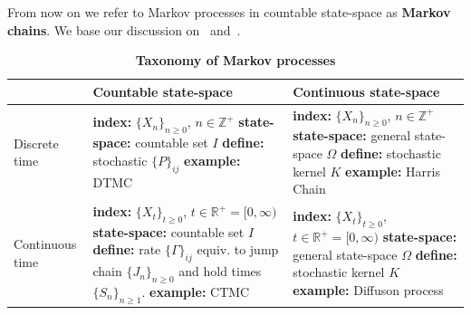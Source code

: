 From now on we refer to Markov processes in countable state-space as \textbf{Markov chains}. We base our discussion on~\cite{rogers1994diffusions} and~\cite{norris1998markov}. 
\begin{table}[h]
	\begin{center}
		\caption[Taxonomy of Markov processes]{\textbf{Taxonomy of Markov processes}}
		\label{tab:MP-taxonomy}
		\begin{tabular}{p{2cm}|p{6cm}|p{6cm}}
			 & Countable state-space & Continuous state-space\\
			\midrule
			Discrete time 
			&\parbox{5cm}{\textbf{index: }$\{X_n\}_{n \geq 0}$, $n \in \mathbb{Z}^{+}$ \\ \textbf{state-space: } countable set $I$ \\ \textbf{define: } stochastic $\{P\}_{ij}$ \\ \textbf{example:} DTMC}  
			&\parbox{5cm}{\textbf{index: }$\{X_n\}_{n \geq 0}$, $n \in \mathbb{Z}^{+}$ \\ \textbf{state-space: } general state-space $\Omega$ \\ \textbf{define: } stochastic kernel $K$ \\ \textbf{example:} Harris Chain}\\
			\midrule
			Continuous time 
			&\parbox{5cm}{\textbf{index: }$\{X_t\}_{t \geq 0}$, $t \in \mathbb{R}^{+}=[0, \infty)$ \\ \textbf{state-space: } countable set $I$ \\ \textbf{define: } rate $\{\Gamma\}_{ij}$ equiv. to jump chain $\{J_n\}_{n\geq0}$ and hold times $\{S_n\}_{n\geq1}$. \\ \textbf{example:} CTMC}
			&\parbox{5cm}{\textbf{index: }$\{X_t\}_{t \geq 0}$, $t \in \mathbb{R}^{+}=[0, \infty)$ \\ \textbf{state-space:} general state-space $\Omega$ \\ \textbf{define: } stochastic kernel $K$ \\ \textbf{example:} Diffuson process}\\
			\bottomrule %
		\end{tabular}
	\end{center}
\end{table}
